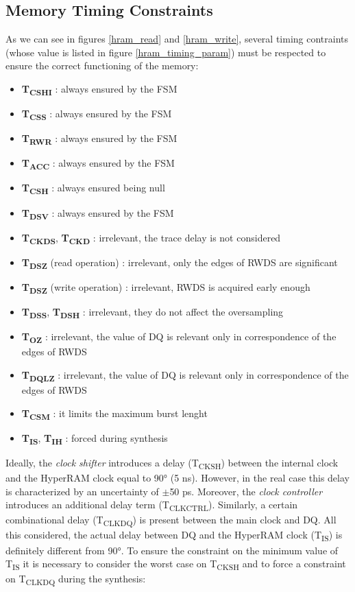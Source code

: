 \documentclass[10pt, english, a4paper, titlepage, oneside]{book}
\begin{document}
\subsection{Memory Timing Constraints} \label{timing_constraints}
\vspace{2mm}
As we can see in figures \ref{hram_read} and \ref{hram_write}, several timing contraints (whose value is listed in figure \ref{hram_timing_param}) must be respected to ensure the correct functioning of the memory:
\vspace{2mm}
\begin{itemize}
    \item \textbf{T\textsubscript{CSHI}} : always ensured by the FSM
    \item \textbf{T\textsubscript{CSS}} : always ensured by the FSM
    \item \textbf{T\textsubscript{RWR}} : always ensured by the FSM
    \item \textbf{T\textsubscript{ACC}} : always ensured by the FSM
    \item \textbf{T\textsubscript{CSH}} : always ensured being null
    \item \textbf{T\textsubscript{DSV}} : always ensured by the FSM
    \item \textbf{T\textsubscript{CKDS}}, \textbf{T\textsubscript{CKD}} : irrelevant, the trace delay is not considered
    \item \textbf{T\textsubscript{DSZ}} (read operation) : irrelevant, only the edges of RWDS are significant
    \item \textbf{T\textsubscript{DSZ}} (write operation) : irrelevant, RWDS is acquired early enough
    \item \textbf{T\textsubscript{DSS}}, \textbf{T\textsubscript{DSH}} : irrelevant, they do not affect the oversampling
    \item \textbf{T\textsubscript{OZ}} : irrelevant, the value of DQ is relevant only in correspondence of the edges of RWDS
    \item \textbf{T\textsubscript{DQLZ}} : irrelevant, the value of DQ is relevant only in correspondence of the edges of RWDS
    \item \textbf{T\textsubscript{CSM}} : it limits the maximum burst lenght
    \item \textbf{T\textsubscript{IS}}, \textbf{T\textsubscript{IH}} : forced during synthesis
\end{itemize}
\vspace{4mm}
Ideally, the \textit{clock shifter} introduces a delay (T\textsubscript{CKSH}) between the internal clock and the HyperRAM clock equal to 90° (5 ns). However, in the real case this delay is characterized by an uncertainty of $\pm$50 ps. Moreover, the \textit{clock controller} introduces an additional delay term (T\textsubscript{CLKCTRL}). Similarly, a certain combinational delay (T\textsubscript{CLKDQ}) is present between the main clock and DQ. All this considered, the actual delay between DQ and the HyperRAM clock (T\textsubscript{IS}) is definitely different from 90°. To ensure the constraint on the minimum value of T\textsubscript{IS} it is necessary to consider the worst case on T\textsubscript{CKSH} and to force a constraint on T\textsubscript{CLKDQ} during the synthesis:
\end{document}
